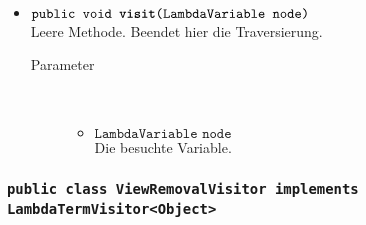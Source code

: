 \begin{description}
\begin{itemize}
		\item $\texttt{public void \textbf{visit}(LambdaVariable node)}$ \\ Leere Methode. Beendet hier die Traversierung.
		\begin{description}
			\item[Parameter] \hfill \\
			\vspace{-.8cm}
			\begin{itemize}
				\item $\texttt{LambdaVariable node}$ \\ Die besuchte Variable.
			\end{itemize}
		\end{description}
	\end{itemize}
\end{description}

\subsubsection{\normalfont \texttt{public class \textbf{ViewRemovalVisitor} implements LambdaTermVisitor<Object>}}

